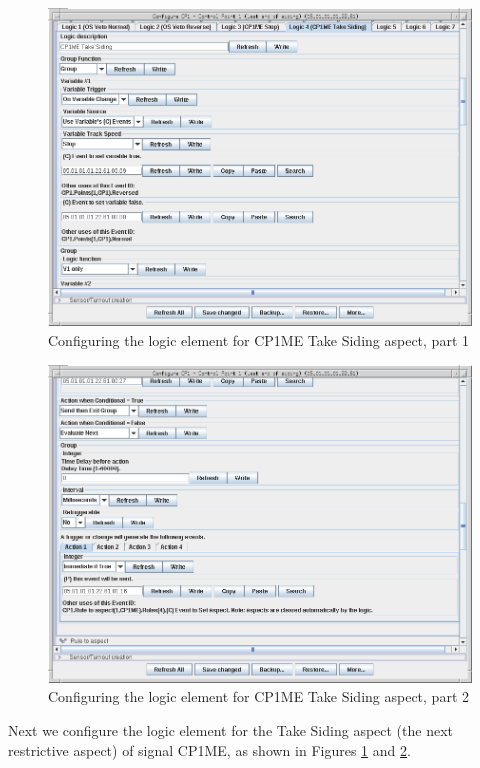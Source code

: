 \clearpage
\begin{figure}[hbpt]\begin{centering}%
\includegraphics[width=5in]{CP1ME-TakeSiding-Logic-Config1.png}
\caption{Configuring the logic element for CP1ME Take Siding aspect, part 1}
\label{fig:CP1ME-TakeSiding-Logic-Config1}
\end{centering}\end{figure}
\begin{figure}[hbpt]\begin{centering}%
\includegraphics[width=5in]{CP1ME-TakeSiding-Logic-Config2.png}
\caption{Configuring the logic element for CP1ME Take Siding aspect, part 2}
\label{fig:CP1ME-TakeSiding-Logic-Config2}
\end{centering}\end{figure}
Next we configure the logic element for the Take Siding aspect (the next 
restrictive aspect) of signal CP1ME, as shown in Figures 
\ref{fig:CP1ME-TakeSiding-Logic-Config1} and 
\ref{fig:CP1ME-TakeSiding-Logic-Config2}.
 
